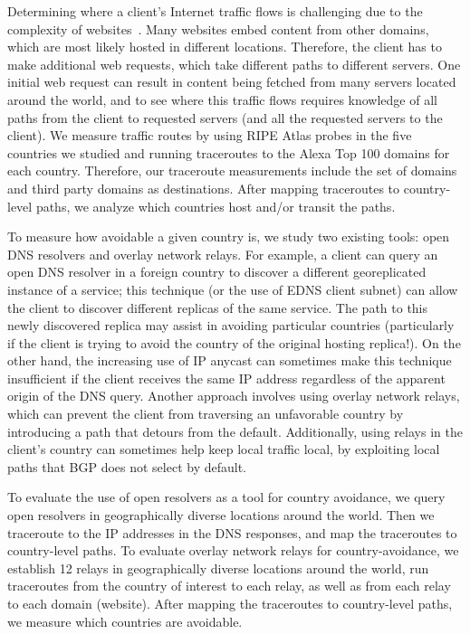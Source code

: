 Determining where a client's Internet traffic flows is challenging due to the
 complexity of websites~\cite{butkiewicz2011understanding}.  Many
websites embed content from other domains, which are most likely
hosted in different locations.  Therefore, the client has to make
additional web requests, which take different paths to different servers.  One initial web
request can result in content being fetched from many servers located
around the world, and to see where this traffic flows requires knowledge
of all paths from the client to requested servers (and all the requested
servers to the client).  We measure traffic routes by using RIPE 
Atlas probes in the five countries we studied and running traceroutes to 
the Alexa Top 100 domains for each country.  Therefore, our traceroute measurements include the 
set of domains and third party domains as destinations.  After mapping 
traceroutes to country-level paths, we analyze which 
countries host and/or transit the paths.

To measure how avoidable a given country is, we study two existing tools: open DNS resolvers 
and overlay network relays. For
example, a client can query an open DNS resolver in a foreign country to
discover a different georeplicated instance of a service; this technique
(or the use of EDNS client subnet) can allow the client to discover
different replicas of the same service. The path to this newly
discovered replica may assist in avoiding particular countries
(particularly if the client is trying to avoid the country of the
original hosting replica!).  On the other hand, the increasing use of IP anycast \cite{cicalese2015characterizing} can
sometimes make this technique insufficient if the client
receives the same IP address regardless of the apparent origin of the
DNS query.  Another approach involves using overlay network relays, which can
prevent the client from traversing an unfavorable country by introducing
a path that detours from the default. Additionally, using
relays in the client's country can sometimes help keep local traffic
local, by exploiting local paths that BGP does not select by default.

To evaluate the use of open resolvers as a tool for country avoidance, we
query open resolvers in geographically diverse locations around the world.  Then we traceroute 
to the IP addresses in the DNS responses, and map the traceroutes to country-level paths.  To evaluate 
overlay network relays for country-avoidance, we establish 12 relays in geographically 
diverse locations around the world, run traceroutes from the country of interest to 
each relay, as well as from each relay to each domain (website).  After mapping 
the traceroutes to country-level paths, we measure which countries are 
avoidable.

